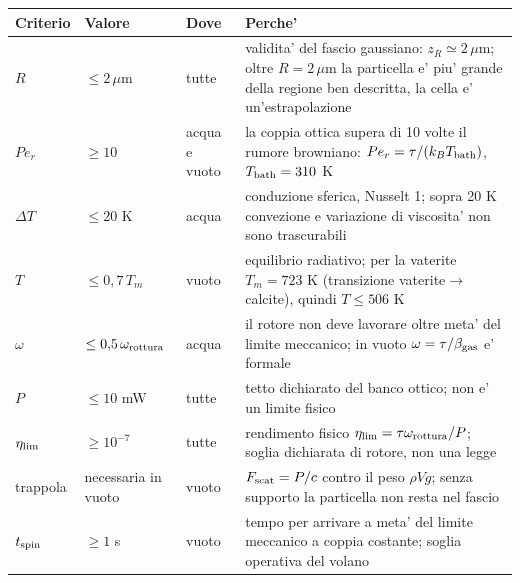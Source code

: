 \begin{tabular}{@{}p{2.4cm}p{2.3cm}p{2.2cm}p{7.8cm}@{}}
\hline
Criterio & Valore & Dove & Perche' \\
\hline
$R$ & $\le2\,\mu$m & tutte & validita' del fascio gaussiano: $z_R\simeq2\,\mu$m; oltre $R=2\,\mu$m la particella e' piu' grande della regione ben descritta, la cella e' un'estrapolazione \\
$Pe_r$ & $\ge10$ & acqua e vuoto & la coppia ottica supera di 10 volte il rumore browniano: $Pe_r=\tau/(k_BT_{\rm bath})$, $T_{\rm bath}=310$ K \\
$\Delta T$ & $\le20$ K & acqua & conduzione sferica, Nusselt 1; sopra 20 K convezione e variazione di viscosita' non sono trascurabili \\
$T$ & $\le0{,}7\,T_m$ & vuoto & equilibrio radiativo; per la vaterite $T_m=723$ K (transizione vaterite$\to$calcite), quindi $T\le506$ K \\
$\omega$ & $\le0{,}5\,\omega_{\rm rottura}$ & acqua & il rotore non deve lavorare oltre meta' del limite meccanico; in vuoto $\omega=\tau/\beta_{\rm gas}$ e' formale \\
$P$ & $\le10$ mW & tutte & tetto dichiarato del banco ottico; non e' un limite fisico \\
$\eta_{\rm lim}$ & $\ge10^{-7}$ & tutte & rendimento fisico $\eta_{\rm lim}=\tau\omega_{\rm rottura}/P$; soglia dichiarata di rotore, non una legge \\
trappola & necessaria in vuoto & vuoto & $F_{\rm scat}=P/c$ contro il peso $\rho Vg$; senza supporto la particella non resta nel fascio \\
$t_{\rm spin}$ & $\ge1$ s & vuoto & tempo per arrivare a meta' del limite meccanico a coppia costante; soglia operativa del volano \\
\hline
\end{tabular}
